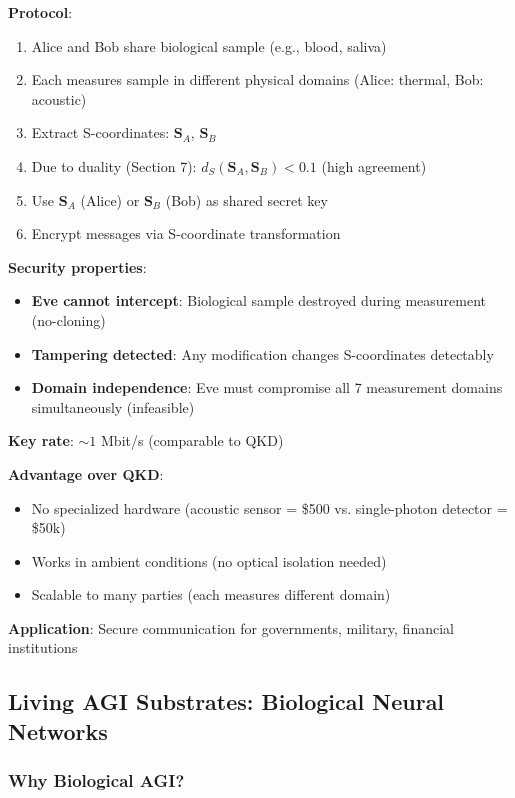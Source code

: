 \documentclass[11pt,a4paper]{article}
\begin{document}
\textbf{Protocol}:
\begin{enumerate}
\item Alice and Bob share biological sample (e.g., blood, saliva)
\item Each measures sample in different physical domains (Alice: thermal, Bob: acoustic)
\item Extract S-coordinates: $\mathbf{S}_A$, $\mathbf{S}_B$
\item Due to duality (Section 7): $d_S(\mathbf{S}_A, \mathbf{S}_B) < 0.1$ (high agreement)
\item Use $\mathbf{S}_A$ (Alice) or $\mathbf{S}_B$ (Bob) as shared secret key
\item Encrypt messages via S-coordinate transformation
\end{enumerate}

\textbf{Security properties}:
\begin{itemize}
\item \textbf{Eve cannot intercept}: Biological sample destroyed during measurement (no-cloning)
\item \textbf{Tampering detected}: Any modification changes S-coordinates detectably
\item \textbf{Domain independence}: Eve must compromise all 7 measurement domains simultaneously (infeasible)
\end{itemize}

\textbf{Key rate}: $\sim 1$ Mbit/s (comparable to QKD)

\textbf{Advantage over QKD}:
\begin{itemize}
\item No specialized hardware (acoustic sensor = \$500 vs. single-photon detector = \$50k)
\item Works in ambient conditions (no optical isolation needed)
\item Scalable to many parties (each measures different domain)
\end{itemize}

\textbf{Application}: Secure communication for governments, military, financial institutions

\subsection{Living AGI Substrates: Biological Neural Networks}

\subsubsection{Why Biological AGI?}
\end{document}
